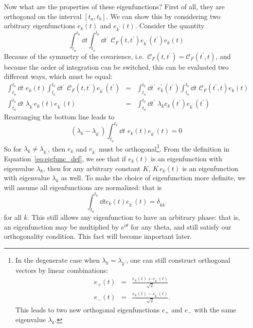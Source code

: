 Now what are the properties of these eigenfunctions?  First of all, they
are orthogonal on the interval $[t_a, t_b]$.
We can show this by considering two arbitrary eigenfunctions
$e_k(t)$ and $e_{k^\prime}(t)$.  Consider the quantity
\begin{equation}
  \int_{t_a}^{t_b} \dd t \int_{t_a}^{t_b} \dd t^\prime\,\, \mathcal{C}_F(t, t^\prime)
  e_{k^\prime}(t^\prime) e_k(t)
\end{equation}
Because of the symmetry of the covarience,
i.e.~$\mathcal{C}_F(t, t^\prime) = \mathcal{C}_F(t^\prime, t)$, and
because the order of integration can be switched, this can be evaluated
two different ways, which must be equal:
\begin{eqnarray}
  \int_{t_a}^{t_b} \dd t\,\, e_k(t)
  \int_{t_a}^{t_b} \dd t^\prime\,\, \mathcal{C}_F(t, t^\prime) e_{k^\prime}(t^\prime) &=&
  \int_{t_a}^{t_b} \dd t^\prime\,\, e_k^\prime(t^\prime)
  \int_{t_a}^{t_b} \dd t\,\, \mathcal{C}_F(t^\prime, t) e_{k}(t)
  \nonumber\\
  \int_{t_a}^{t_b} \dd t\,\, \lambda_{k^\prime} e_k(t) e_{k^\prime}(t) &=&
  \int_{t_a}^{t_b} \dd t^\prime\,\, \lambda_k e_k(t^\prime) e_{k^\prime}(t^\prime)
\end{eqnarray}
Rearranging the bottom line leads to
\begin{equation}
  (\lambda_k - \lambda_{k^\prime})
  \int_{t_a}^{t_b} \dd t\,\, e_k(t) e_{k^\prime}(t) = 0
\end{equation}
So for $\lambda_k \ne \lambda_{k^\prime}$, then $e_k$ and $e_{k^\prime}$
must be orthogonal\footnote{In the degenerate case when
$\lambda_k = \lambda_{k^\prime}$, one can still construct orthogonal
vectors by linear combinations:
\begin{eqnarray}
  e_+(t) &=& \frac{e_k(t) + e_{k^\prime}(t)}{\sqrt{2}} \nonumber\\
  e_-(t) &=& \frac{e_k(t) - e_{k^\prime}(t)}{\sqrt{2}}. \nonumber
\end{eqnarray}
This leads to two new orthogonal eigenfunctions $e_+$ and $e_-$ with the
same eigenvalue $\lambda_k$.}.  From the definition in
Equation~\ref{eq:eigfunc_def}, we see that if $e_k(t)$ is an eigenfunction
with eigenvalue $\lambda_k$,
then for any arbitrary constant $K$,
$K\, e_k(t)$ is an eigenfunction with eigenvalue $\lambda_k$ as well.
To make the choice of eigenfunction more definite, we will assume all
eigenfunctions are normalized: that is
\begin{equation}
  \int_{t_a}^{t_b} \dd t e_k(t) e_{k^\prime}(t) = \delta_{kk^\prime}
\end{equation}
for all $k$.  This still allows any eigenfunction to have an arbitrary
phase: that is, an eigenfunction may be multiplied by $e^{i\theta}$ for
any theta, and still satisfy our orthogonality condition.  This fact
will become important later.

